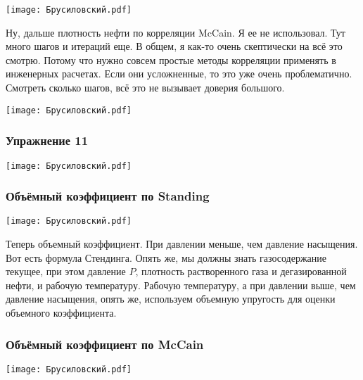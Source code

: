 \documentclass[main.tex]{subfiles}
\begin{document}
\begin{center}
\texttt{[image: Брусиловский.pdf]}
\end{center}

Ну, дальше плотность нефти по корреляции McCain.
Я ее не использовал.
Тут много шагов и итераций еще.
В общем, я как-то очень скептически на всё это смотрю.
Потому что нужно совсем простые методы корреляции применять в инженерных расчетах.
Если они усложненные, то это уже очень проблематично.
Смотреть сколько шагов, всё это не вызывает доверия большого.

\begin{center}
\texttt{[image: Брусиловский.pdf]}
\end{center}



\subsubsection{Упражнение 11}

\begin{center}
\texttt{[image: Брусиловский.pdf]}
\end{center}



\subsubsection{Объёмный коэффициент по Standing}

\begin{center}
\texttt{[image: Брусиловский.pdf]}
\end{center}

Теперь объемный коэффициент.
При давлении меньше, чем давление насыщения.
Вот есть формула Стендинга.
Опять же, мы должны знать газосодержание текущее, при этом давление $P$, плотность растворенного газа и дегазированной нефти, и рабочую температуру.
Рабочую температуру, а при давлении выше, чем давление насыщения, опять же, используем объемную упругость для оценки объемного коэффициента.

\subsubsection{Объёмный коэффициент по McCain}

\begin{center}
\texttt{[image: Брусиловский.pdf]}
\end{center}
\end{document}
